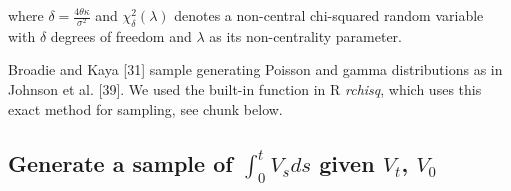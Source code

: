 \documentclass[12pt,oneside]{reedthesis}
\theoremstyle{definition}
\theoremstyle{definition}
\theoremstyle{remark}
\begin{document}
  where \(\delta = \frac{4 \theta \kappa}{\sigma^2}\) and
  \(\chi_{\delta}^{2}(\lambda)\) denotes a non-central chi-squared random
  variable with \(\delta\) degrees of freedom and \(\lambda\) as its
  non-centrality parameter.
  
  Broadie and Kaya {[}31{]} sample generating Poisson and gamma
  distributions as in Johnson et al. {[}39{]}. We used the built-in
  function in R \emph{rchisq}, which uses this exact method for sampling,
  see chunk below.
  \begin{Shaded}
  \begin{Highlighting}[]
  \StringTok{ }\NormalTok{(} \OperatorTok{*}\StringTok{ }\OperatorTok{*}\StringTok{ }\OperatorTok{/}\OperatorTok{^}
  \StringTok{ }\OperatorTok{^} \OperatorTok{*}\StringTok{ }\NormalTok{(} \OperatorTok{-}\StringTok{ }\NormalTok{(}\OperatorTok{-}\OperatorTok{*}\OperatorTok{/}\NormalTok{(}\OperatorTok{*}
  \StringTok{ }\OperatorTok{-}
  
  \StringTok{ }\NormalTok{(}\OperatorTok{*}\OperatorTok{*}\NormalTok{(}\OperatorTok{-}\OperatorTok{*}\OperatorTok{*}\OperatorTok{/}\OperatorTok{^} \OperatorTok{*}\StringTok{ }\NormalTok{(}\OperatorTok{-}\NormalTok{(}\OperatorTok{-}\OperatorTok{*}
  \StringTok{ }\OperatorTok{*}\StringTok{ }\OperatorTok{::}\NormalTok{(} \NormalTok{, }
  \end{Highlighting}
  \end{Shaded}
  \subsection{\texorpdfstring{Generate a sample of \(\int_0^t V_sds\)
  given \(V_t\),
  \(V_0\)}{Generate a sample of \textbackslash{}int\_0\^{}t V\_sds given V\_t, V\_0}}\label{generate-a-sample-of-int_0t-v_sds-given-v_t-v_0}
  
\end{document}

